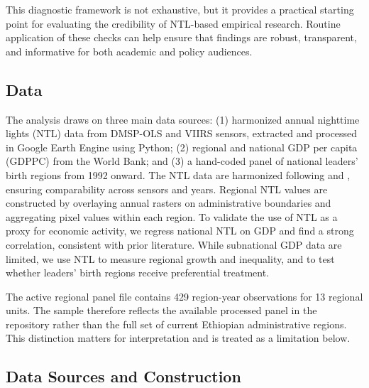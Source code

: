 \documentclass[12pt,a4paper]{article}
\begin{document}
This diagnostic framework is not exhaustive, but it provides a practical starting point for evaluating the credibility of NTL-based empirical research. Routine application of these checks can help ensure that findings are robust, transparent, and informative for both academic and policy audiences.

\subsection{Data}

The analysis draws on three main data sources: (1) harmonized annual nighttime lights (NTL) data from DMSP-OLS and VIIRS sensors, extracted and processed in Google Earth Engine using Python; (2) regional and national GDP per capita (GDPPC) from the World Bank; and (3) a hand-coded panel of national leaders’ birth regions from 1992 onward. The NTL data are harmonized following \citet{Li2023} and \citet{Elvidge2021}, ensuring comparability across sensors and years. Regional NTL values are constructed by overlaying annual rasters on administrative boundaries and aggregating pixel values within each region. To validate the use of NTL as a proxy for economic activity, we regress national NTL on GDP and find a strong correlation, consistent with prior literature. While subnational GDP data are limited, we use NTL to measure regional growth and inequality, and to test whether leaders’ birth regions receive preferential treatment.

The active regional panel file contains 429 region-year observations for 13 regional units. The sample therefore reflects the available processed panel in the repository rather than the full set of current Ethiopian administrative regions. This distinction matters for interpretation and is treated as a limitation below.

\subsection{Data Sources and Construction}
\end{document}
